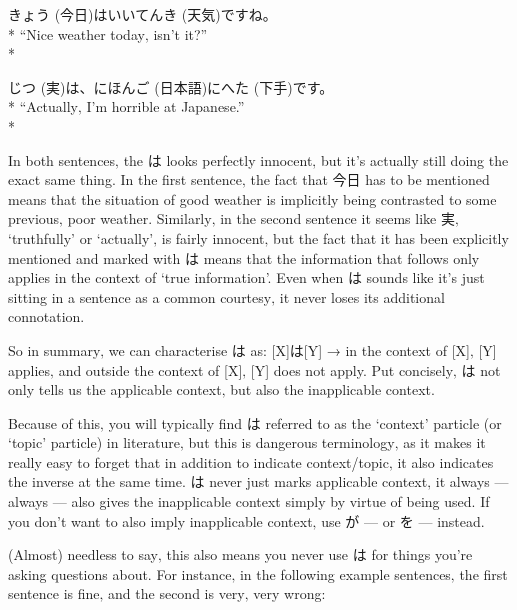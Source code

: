 \documentclass[11pt, b5paper, twoside, openright, onecolumn]{book}
\makeatletter
\newcommand*{\rubystack}[2]{{\relscale{0.5}%
  \begin{tabular}[b]{@{}c@{}}%
    {#1}\\%
   {\textscale{2}{#2}}%
  \end{tabular}}%
}
\DeclareRobustCommand*{\ruby}[2]{%
  \mbox{%
    \setlength{\parskip}{0ex}%
    \BeginAccSupp{method=pdfstringdef,ActualText={#1}}%
      \rubystack{\phantom{#2}}{#1}%
      \llap{%
        \rubystack{#2}{\phantom{#1}}%
      }%
    \EndAccSupp{}%
  }%
}
\renewcommand*{\ruby}[2]{#2 (#1)}%
\newenvironment{exampleblock}{
\setlength{\parindent}{0.6in}
\begin{minipage}[t]{\dimexpr\textwidth-\parindent}}
{\end{minipage}}
\makeatother
\begin{document}
\vspace{0.4cm}
\begin{exampleblock}
\ruby{今日}{きょう}はいい\ruby{天気}{てんき}ですね。 \\* 
“Nice weather today‚ isn’t it?” \\* 
\end{exampleblock}
\vspace{0.2cm}

\begin{exampleblock}
\ruby{実}{じつ}は、\ruby{日本語}{にほんご}に\ruby{下手}{へた}です。 \\* 
“Actually‚ I’m horrible at Japanese.” \\* 
\end{exampleblock}
\vspace{0.2cm}

In both sentences‚ the は looks perfectly innocent‚ but it’s actually still doing the exact same thing. In the first sentence‚ the fact that 今日 has to be mentioned means that the situation of good weather is implicitly being contrasted to some previous‚ poor weather. Similarly‚ in the second sentence it seems like 実‚ ‘truthfully’ or ‘actually’‚ is fairly innocent‚ but the fact that it has been explicitly mentioned and marked with は means that the information that follows only applies in the context of ‘true information’. Even when は sounds like it’s just sitting in a sentence as a common courtesy‚ it never loses its additional connotation.

So in summary‚ we can characterise は as: [X]は[Y] → in the context of [X]‚ [Y] applies‚ and outside the context of [X]‚ [Y] does not apply. Put concisely‚ は not only tells us the applicable context‚ but also the inapplicable context.

Because of this‚ you will typically find は referred to as the ‘context’ particle (or ‘topic’ particle) in literature‚ but this is dangerous terminology‚ as it makes it really easy to forget that in addition to indicate context/topic‚ it also indicates the inverse at the same time. は never just marks applicable context‚ it always — always — also gives the inapplicable context simply by virtue of being used. If you don’t want to also imply inapplicable context‚ use が — or を — instead.

(Almost) needless to say‚ this also means you never use は for things you’re asking questions about. For instance‚ in the following example sentences‚ the first sentence is fine‚ and the second is very‚ very wrong:
\end{document}
